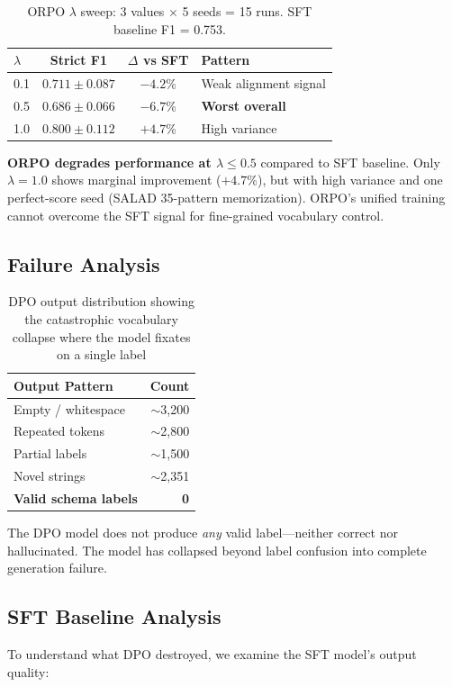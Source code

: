 \documentclass[journal]{IEEEtran}
\begin{document}
\begin{table}[!ht]
\centering\caption{ORPO $\lambda$ sweep: 3 values $\times$ 5 seeds = 15 runs. SFT baseline F1 = 0.753.}
\label{tab:orpo}
\begin{tabular}{lccl}
\toprule
\textbf{$\lambda$} & \textbf{Strict F1} & \textbf{$\Delta$ vs SFT} & \textbf{Pattern} \\
\midrule
0.1 & $0.711 \pm 0.087$ & $-4.2$\% & Weak alignment signal \\
0.5 & $0.686 \pm 0.066$ & $-6.7$\% & \textbf{Worst overall} \\
1.0 & $0.800 \pm 0.112$ & $+4.7$\% & High variance \\
\bottomrule
\end{tabular}
\end{table}

\textbf{ORPO degrades performance at $\lambda \leq 0.5$} compared to SFT baseline. Only $\lambda = 1.0$ shows marginal improvement ($+4.7\%$), but with high variance and one perfect-score seed (SALAD 35-pattern memorization). ORPO's unified training cannot overcome the SFT signal for fine-grained vocabulary control.

\subsection{Failure Analysis}

\begin{table}[!ht]
\centering\caption{DPO output distribution showing the catastrophic vocabulary collapse where the model fixates on a single label}
\label{tab:outputs}
\begin{tabular}{lr}
\toprule
\textbf{Output Pattern} & \textbf{Count} \\
\midrule
Empty / whitespace & $\sim$3,200 \\
Repeated tokens & $\sim$2,800 \\
Partial labels & $\sim$1,500 \\
Novel strings & $\sim$2,351 \\
\midrule
\textbf{Valid schema labels} & \textbf{0} \\
\bottomrule
\end{tabular}
\end{table}

The DPO model does not produce \emph{any} valid label---neither correct nor hallucinated. The model has collapsed beyond label confusion into complete generation failure.

\subsection{SFT Baseline Analysis}
To understand what DPO destroyed, we examine the SFT model's output quality:
\end{document}
